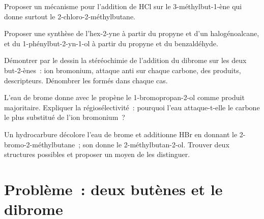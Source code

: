 \begin{exercise}[$\star\star$]\label{exo:b1:electrophilic-additions:8}
Proposer un mécanisme pour l'addition de HCl sur le 3-méthylbut-1-ène
qui donne surtout le 2-chloro-2-méthylbutane.
\end{exercise}

\begin{exercise}[$\star\star$]\label{exo:b1:electrophilic-additions:9}
Proposer une synthèse de l'hex-2-yne à partir du propyne et d'un
halogénoalcane, et du 1-phénylbut-2-yn-1-ol à partir du propyne et du
benzaldéhyde.
\end{exercise}

\begin{exercise}[$\star\star\star$]\label{exo:b1:electrophilic-additions:10}
Démontrer par le dessin la stéréochimie de l'addition du dibrome sur les
deux but-2-ènes~: ion bromonium, attaque anti sur chaque carbone,
 des produits, descripteurs. Dénombrer les
 formés dans chaque cas.
\end{exercise}

\begin{exercise}[$\star\star\star$]\label{exo:b1:electrophilic-additions:11}
L'eau de brome donne avec le propène le 1-bromopropan-2-ol comme produit
majoritaire. Expliquer la régiosélectivité~: pourquoi l'eau attaque-t-elle
le carbone le plus substitué de l'ion bromonium~?
\end{exercise}

\begin{exercise}[$\star\star\star$]\label{exo:b1:electrophilic-additions:12}
Un hydrocarbure  décolore l'eau de brome et additionne HBr en
donnant le 2-bromo-2-méthylbutane~; son  donne le
2-méthylbutan-2-ol. Trouver deux structures possibles et proposer un
moyen de les distinguer.
\end{exercise}

\section{Problème~: deux butènes et le dibrome}

